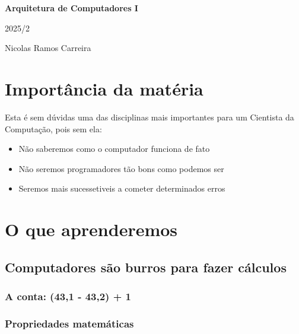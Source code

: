 \documentclass[12pt,a4paper]{report}
\begin{document}
	
	\begin{titlepage}
		\centering
		\vspace*{5cm} %
		
		{\Huge\bfseries Arquitetura de Computadores I\par} %
		
		\vspace{0.5cm}
		{\Large 2025/2\par} %
		
		\vfill
		{\large Nicolas Ramos Carreira\par} %
		
		\vspace*{2cm}
	\end{titlepage}
	
	\tableofcontents
	\newpage
	
	\chapter{Importância da matéria}
	Esta é sem dúvidas uma das disciplinas mais importantes para um Cientista da Computação, pois sem ela:
	
	\begin{itemize}
		\item Não saberemos como o computador funciona de fato
		\item Não seremos programadores tão bons como podemos ser
		\item Seremos mais sucessetiveis a cometer determinados erros
		
	\end{itemize}
	
	\chapter{O que aprenderemos}
	\section{Computadores são burros para fazer cálculos}
	\subsection{A conta: (43,1 - 43,2) + 1}
	\subsection{Propriedades matemáticas}
\end{document}
